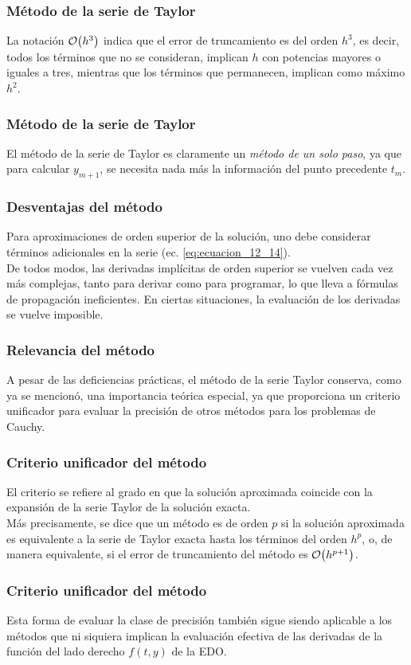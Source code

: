 \begin{frame}
\frametitle{Método de la serie de Taylor}
La notación $\order{h^{3}}$ indica que el error de truncamiento es del orden $h^{3}$, es decir, todos los términos que no se consideran, implican $h$ con potencias mayores o iguales a tres, mientras que los términos que permanecen, implican como máximo $h^{2}$.
\end{frame}
\begin{frame}
\frametitle{Método de la serie de Taylor}
El método de la serie de Taylor es claramente un \emph{método de un solo paso}, ya que para calcular $y_{m+1}$, se necesita nada más la información del punto precedente $t_{m}$.
\end{frame}
\begin{frame}
\frametitle{Desventajas del método}
Para aproximaciones de orden superior de la solución, uno debe considerar términos adicionales en la serie (ec. \ref{eq:ecuacion_12_14}).
\\
\bigskip
De todos modos, las derivadas implícitas de orden superior se vuelven cada vez más complejas, tanto para derivar como para programar, lo que lleva a fórmulas de propagación ineficientes. En ciertas situaciones, la evaluación de los derivadas se vuelve imposible.
\end{frame}
\begin{frame}
\frametitle{Relevancia del método}
A pesar de las deficiencias prácticas, el método de la serie Taylor conserva, como ya se mencionó, una importancia teórica especial, ya que proporciona un criterio unificador para evaluar la precisión de otros métodos para los problemas de Cauchy.
\end{frame}
\begin{frame}
\frametitle{Criterio unificador del método}
El criterio se refiere al grado en que la solución aproximada coincide con la expansión de la serie Taylor de la solución exacta.
\\
\bigskip
\pause
Más precisamente, se dice que un método es de orden $p$ si la solución aproximada es equivalente a la serie de Taylor exacta hasta los términos del orden $h^{p}$, o, de manera equivalente, si el error de truncamiento del método es $\order{h^{p+1}}$.
\end{frame}
\begin{frame}
\frametitle{Criterio unificador del método}
Esta forma de evaluar la clase de precisión también sigue siendo aplicable a los métodos que ni siquiera implican la evaluación efectiva de las derivadas de la función del lado derecho $f(t, y)$ de la EDO.
\end{frame}
